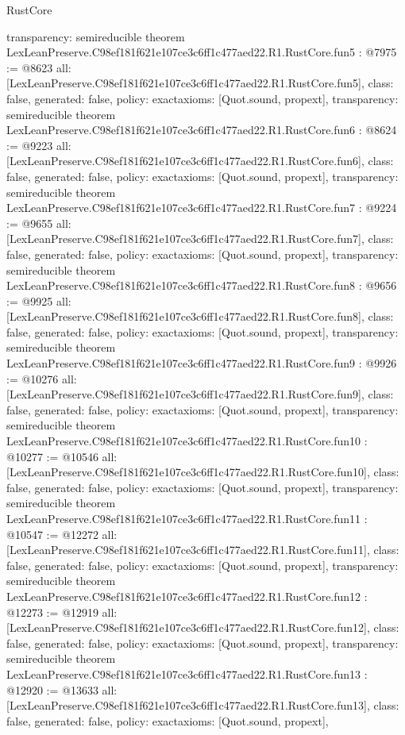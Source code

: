 \begin{lexlean}{RustCore}
\begin{coremodule}
{  transparency: semireducible
}
theorem LexLeanPreserve.C98ef181f621e107ce3c6ff1c477aed22.R1.RustCore.fun5 : @7975 := @8623 {
  all: [LexLeanPreserve.C98ef181f621e107ce3c6ff1c477aed22.R1.RustCore.fun5],
  class: false,
  generated: false,
  policy: exact{axioms: [Quot.sound, propext]},
  transparency: semireducible
}
theorem LexLeanPreserve.C98ef181f621e107ce3c6ff1c477aed22.R1.RustCore.fun6 : @8624 := @9223 {
  all: [LexLeanPreserve.C98ef181f621e107ce3c6ff1c477aed22.R1.RustCore.fun6],
  class: false,
  generated: false,
  policy: exact{axioms: [Quot.sound, propext]},
  transparency: semireducible
}
theorem LexLeanPreserve.C98ef181f621e107ce3c6ff1c477aed22.R1.RustCore.fun7 : @9224 := @9655 {
  all: [LexLeanPreserve.C98ef181f621e107ce3c6ff1c477aed22.R1.RustCore.fun7],
  class: false,
  generated: false,
  policy: exact{axioms: [Quot.sound, propext]},
  transparency: semireducible
}
theorem LexLeanPreserve.C98ef181f621e107ce3c6ff1c477aed22.R1.RustCore.fun8 : @9656 := @9925 {
  all: [LexLeanPreserve.C98ef181f621e107ce3c6ff1c477aed22.R1.RustCore.fun8],
  class: false,
  generated: false,
  policy: exact{axioms: [Quot.sound, propext]},
  transparency: semireducible
}
theorem LexLeanPreserve.C98ef181f621e107ce3c6ff1c477aed22.R1.RustCore.fun9 : @9926 := @10276 {
  all: [LexLeanPreserve.C98ef181f621e107ce3c6ff1c477aed22.R1.RustCore.fun9],
  class: false,
  generated: false,
  policy: exact{axioms: [Quot.sound, propext]},
  transparency: semireducible
}
theorem LexLeanPreserve.C98ef181f621e107ce3c6ff1c477aed22.R1.RustCore.fun10 : @10277 := @10546 {
  all: [LexLeanPreserve.C98ef181f621e107ce3c6ff1c477aed22.R1.RustCore.fun10],
  class: false,
  generated: false,
  policy: exact{axioms: [Quot.sound, propext]},
  transparency: semireducible
}
theorem LexLeanPreserve.C98ef181f621e107ce3c6ff1c477aed22.R1.RustCore.fun11 : @10547 := @12272 {
  all: [LexLeanPreserve.C98ef181f621e107ce3c6ff1c477aed22.R1.RustCore.fun11],
  class: false,
  generated: false,
  policy: exact{axioms: [Quot.sound, propext]},
  transparency: semireducible
}
theorem LexLeanPreserve.C98ef181f621e107ce3c6ff1c477aed22.R1.RustCore.fun12 : @12273 := @12919 {
  all: [LexLeanPreserve.C98ef181f621e107ce3c6ff1c477aed22.R1.RustCore.fun12],
  class: false,
  generated: false,
  policy: exact{axioms: [Quot.sound, propext]},
  transparency: semireducible
}
theorem LexLeanPreserve.C98ef181f621e107ce3c6ff1c477aed22.R1.RustCore.fun13 : @12920 := @13633 {
  all: [LexLeanPreserve.C98ef181f621e107ce3c6ff1c477aed22.R1.RustCore.fun13],
  class: false,
  generated: false,
  policy: exact{axioms: [Quot.sound, propext]},
}
\end{coremodule}
\end{lexlean}
